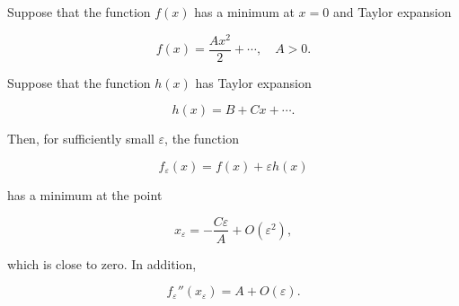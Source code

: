 Suppose that the function $f(x)$ has a minimum at $x = 0$ and Taylor expansion

$$f(x) = \frac{A x^2}{2} + \cdots, \quad A > 0.$$

Suppose that the function $h(x)$ has Taylor expansion

$$h(x) = B + Cx + \cdots.$$

Then, for sufficiently small $\varepsilon$, the function

$$f_\varepsilon(x) = f(x) + \varepsilon h(x)$$

has a minimum at the point

$$x_\varepsilon = -\frac{C \varepsilon}{A} + O(\varepsilon^2),$$

which is close to zero. In addition,

$$f_\varepsilon''(x_\varepsilon) = A + O(\varepsilon).$$
